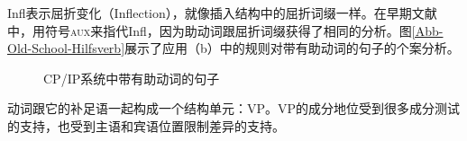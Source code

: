 Infl表示屈折变化（Inflection），就像插入结构中的屈折词缀一样。在早期文献中，用符号\textsc{aux}来指代Infl，因为助动词跟屈折词缀获得了相同的分析。图\vref{Abb-Old-School-Hilfsverb}展示了应用（b）中的规则对带有助动词的句子的个案分析。
%
\begin{figure}
\begin{floatrow}
{\caption{\label{Abb-GB-Hilfsverb}CP/IP系统中带有助动词的句子}}
\end{floatrow}
\end{figure}%

动词跟它的补足语一起构成一个结构单元：VP。VP的成分地位受到很多成分测试的支持，也受到主语和宾语位置限制差异的支持。


